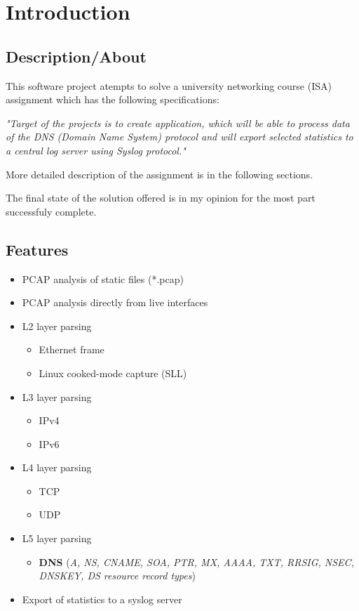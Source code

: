 

\section{Introduction}

\subsection{Description/About}

This software project atempts to solve a university networking course (ISA) assignment
which has the following specifications:

\textit{"Target of the projects is to create application, which will be able to process data of the DNS (Domain Name System)
protocol and will export selected statistics to a central log server using Syslog protocol."}

More detailed description of the assignment is in the following sections.

The final state of the solution offered is in my opinion for the most part successfuly complete.

\subsection{Features}

\begin{itemize}
\item PCAP analysis of static files (*.pcap)
\item PCAP analysis directly from live interfaces
\item L2 layer parsing
    \begin{itemize}
    \item Ethernet frame
    \item Linux cooked-mode capture (SLL)
    \end{itemize}
\item L3 layer parsing
    \begin{itemize}
    \item IPv4
    \item IPv6
    \end{itemize}
\item L4 layer parsing
    \begin{itemize}
    \item TCP
    \item UDP
    \end{itemize}
\item L5 layer parsing 
    \begin{itemize}
    \item \textbf{DNS} (\textit{A, NS, CNAME, SOA, PTR, MX, AAAA, TXT, RRSIG, NSEC, DNSKEY, DS resource record types})
    \end{itemize}
\item Export of statistics to a syslog server
\end{itemize} 
